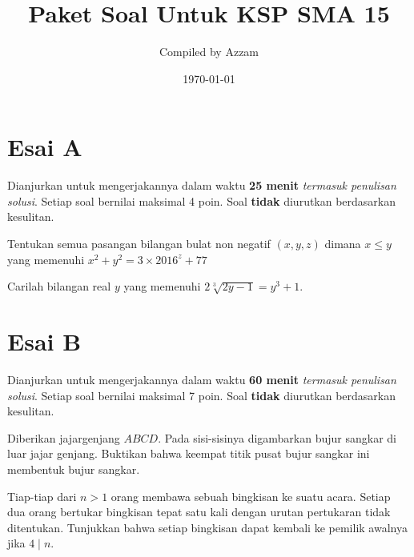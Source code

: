 \documentclass[12pt]{scrartcl}
\begin{document}
	\title{Paket Soal Untuk KSP SMA 15} %
	\date{\today}
	\author{Compiled by Azzam}
	\maketitle

\renewcommand*\contentsname{Daftar Isi}
\tableofcontents

\newpage
	

	\section{Esai A}
	Dianjurkan untuk mengerjakannya dalam waktu \textbf{25 menit} \textit{termasuk penulisan solusi}. Setiap soal bernilai maksimal 4 poin. Soal \textbf{tidak} diurutkan berdasarkan kesulitan. 
	
	\begin{soalbaru}
	Tentukan semua pasangan bilangan bulat non negatif $(x,y,z)$ dimana $x \le y$ yang memenuhi $x^2+y^2=3\times 2016^z+77$
	\end{soalbaru}
	
	\begin{soalbaru}
	Carilah bilangan real $y$ yang memenuhi $2\sqrt[3]{2y-1}=y^3+1.$
	\end{soalbaru}
	
	\section{Esai B}
	Dianjurkan untuk mengerjakannya dalam waktu \textbf{60 menit} \textit{termasuk penulisan solusi}. Setiap soal bernilai maksimal 7 poin. Soal \textbf{tidak} diurutkan berdasarkan kesulitan.
	
	\begin{soalbaru}
		Diberikan jajargenjang $ABCD$. Pada sisi-sisinya digambarkan bujur sangkar di luar jajar genjang. Buktikan bahwa keempat titik pusat bujur sangkar ini membentuk bujur sangkar.
	\end{soalbaru} 
	
	\begin{soalbaru}
	Tiap-tiap dari $n >1$ orang membawa sebuah bingkisan ke suatu acara. Setiap dua orang bertukar bingkisan tepat satu kali dengan urutan pertukaran tidak ditentukan. Tunjukkan bahwa setiap bingkisan dapat kembali ke pemilik awalnya jika $4\mid n$.
	
	
	\end{soalbaru}
	
\end{document}
